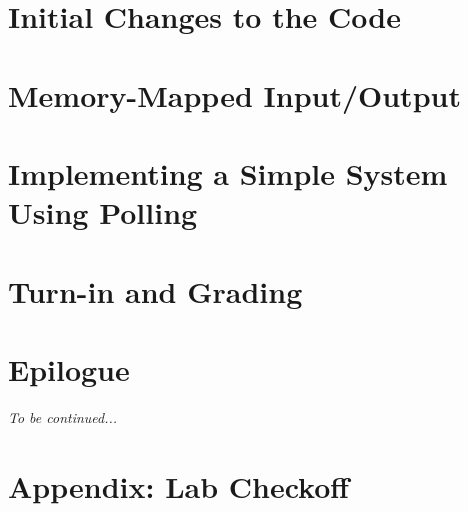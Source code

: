     \section{Initial Changes to the Code} \label{sec:LabTime}                       

    \section{Memory-Mapped Input/Output} \label{sec:MemMapIO}                       

    \section {Implementing a Simple System Using Polling} \label{sec:SimpleSystem}  

    \section{Turn-in and Grading}                                                   

    \section*{Epilogue}                                                             \JeffGoldblum

    \textit{To be continued...}

    \appendix

    \section{Appendix: Lab Checkoff}                                                


